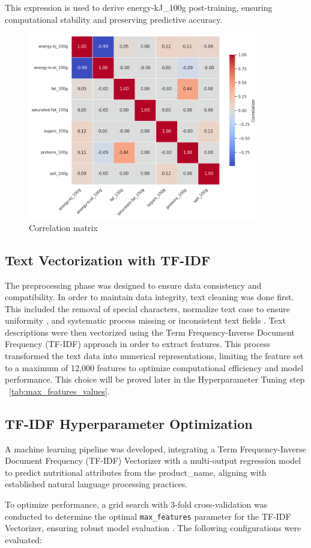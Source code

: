 This expression is used to derive energy-kJ\_100g post-training, ensuring computational stability and preserving predictive accuracy.

\begin{figure}[H]
\includegraphics[width=0.9\textwidth]{images/correlation_matrix.png}
\caption{Correlation matrix} 
\label{fig:Correlation_matrix}
\end{figure}

\subsection{Text Vectorization with TF-IDF}
The preprocessing phase was designed to ensure data consistency and compatibility. In order to maintain data integrity, text cleaning was done first. This included the removal of special characters, normalize text case to ensure uniformity , and systematic process missing or inconsistent text fields . Text descriptions were then vectorized using the Term Frequency-Inverse Document Frequency (TF-IDF) approach in order to extract features. This process transformed the text data into numerical representations, limiting the feature set to a maximum of 12,000 features  to optimize computational efficiency and model performance. This choice will be proved later in the Hyperparameter Tuning step ~\ref{tab:max_features_values}.

\subsection{TF-IDF Hyperparameter Optimization}
A machine learning pipeline was developed, integrating a Term Frequency-Inverse Document Frequency (TF-IDF) Vectorizer with a multi-output regression model to predict nutritional attributes from the product\_name, aligning with established natural language processing practices.
\par To optimize performance, a grid search with 3-fold cross-validation was conducted to determine the optimal \texttt{max\_features} parameter for the TF-IDF Vectorizer, ensuring robust model evaluation \cite{hastie2009elements}. The following configurations were evaluated:

